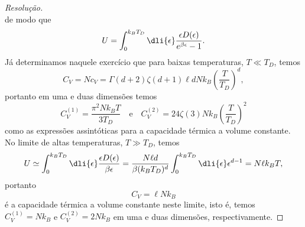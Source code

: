 \begin{proof}[Resolução]
\begin{equation*}
    \end{equation*}
    de modo que
    \begin{equation*}
        U = \int_0^{k_B T_D} \dli{\epsilon} \frac{\epsilon D(\epsilon)}{e^{\beta \epsilon} - 1}.
    \end{equation*}
    Já determinamos naquele exercício que para baixas temperaturas, \(T \ll T_D\), temos
    \begin{equation*}
        C_V = N c_V = \Gamma(d + 2)\zeta(d + 1) \ell d N k_B \left(\frac{T}{T_D}\right)^{d},
    \end{equation*}
    portanto em uma e duas dimensões temos
    \begin{equation*}
        C_V^{(1)} = \frac{\pi^2 N k_B T}{3 T_D}\quad\text{e}\quad C_V^{(2)} = 24 \zeta(3) N k_B \left(\frac{T}{T_D}\right)^2
    \end{equation*}
    como as expressões assintóticas para a capacidade térmica a volume constante. No limite de altas temperaturas, \(T \gg T_D\), temos
    \begin{equation*}
        U \simeq \int_0^{k_B T_D} \dli{\epsilon} \frac{\epsilon D(\epsilon)}{\beta \epsilon} = \frac{N \ell d}{\beta (k_B T_D)^d} \int_0^{k_B T_D} \dli{\epsilon} \epsilon^{d - 1} = N \ell k_B T,
    \end{equation*}
    portanto
    \begin{equation*}
        C_V = \ell N k_B
    \end{equation*}
    é a capacidade térmica a volume constante neste limite, isto é, temos \(C_V^{(1)} = N k_B\) e \(C_V^{(2)} = 2 N k_B\) em uma e duas dimensões, respectivamente.
\end{proof}
